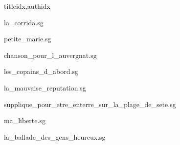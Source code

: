 \documentclass[12pt]{article}
\begin{document}
\begin{songs}{titleidx,authidx}

{la_corrida.sg}


{petite_marie.sg}


{chanson_pour_l_auvergnat.sg}


{les_copains_d_abord.sg}


{la_mauvaise_reputation.sg}


{supplique_pour_etre_enterre_sur_la_plage_de_sete.sg}


{ma_liberte.sg}


{la_ballade_des_gens_heureux.sg}



\end{songs}
\end{document}
